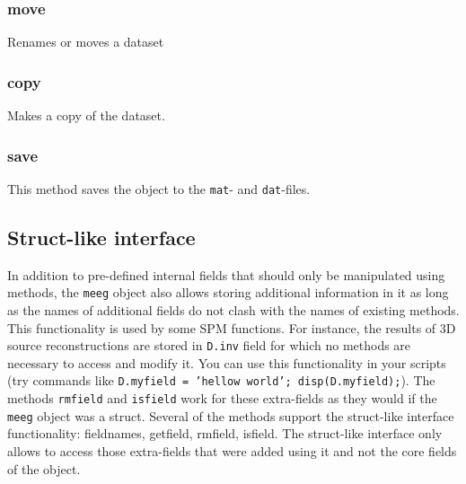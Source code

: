 \subsubsection{move}
Renames or moves a dataset

\subsubsection{copy}
Makes a copy of the dataset.

\subsubsection{save}
This method saves the object to the \texttt{mat}- and \texttt{dat}-files.

\subsection{Struct-like interface}
In addition to pre-defined internal fields that should only be manipulated using methods, the \texttt{meeg} object also allows storing additional information in it as long as the names of additional fields do not clash with the names of existing methods. This functionality is used by some SPM functions. For instance, the results of 3D source reconstructions are stored in \texttt{D.inv} field for which no methods are necessary to access and modify it. You can use this functionality in your scripts (try commands like \texttt{D.myfield = 'hellow world'; disp(D.myfield);}). The methods \texttt{rmfield} and \texttt{isfield} work for these extra-fields as they would if the \texttt{meeg} object was a struct. Several of the methods support the struct-like interface functionality: fieldnames, getfield, rmfield, isfield. The struct-like interface only allows to access those extra-fields that were added using it and not the core fields of the object.

